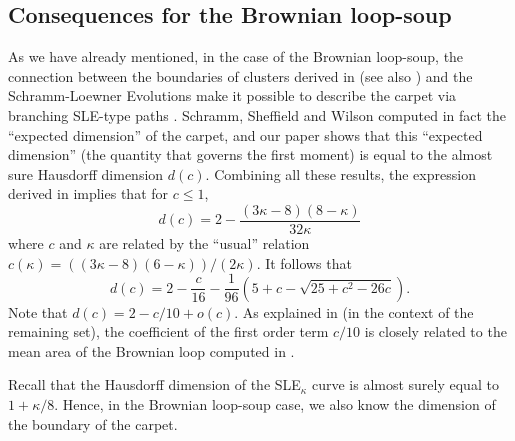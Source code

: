 \documentclass[11pt]{article}
\begin{document}
 
\subsection {Consequences for the Brownian loop-soup}

As we have already mentioned, in the case of the Brownian loop-soup, 
the connection between the boundaries of clusters derived in 
\cite {ShW,ShW2} (see also \cite {Wcras}) and the Schramm-Loewner Evolutions 
make it possible to describe the carpet via branching SLE-type paths \cite {Sh}. 
Schramm, Sheffield and Wilson \cite {SchShW} computed in fact the 
``expected dimension'' of the carpet, and our paper shows that this 
``expected dimension'' (the quantity that governs the first moment) is equal to
the almost sure Hausdorff dimension $d(c)$. 
Combining all these results, the expression derived 
in \cite {SchShW} implies that for $c\le 1$,
$$ 
d(c) = 2 - \frac {(3 \kappa - 8)(8 - \kappa)} {32 \kappa}
$$
where $c$ and $\kappa$ are related by the ``usual'' relation 
$
c(\kappa) = ({(3\kappa -8) (6 - \kappa)})/({2 \kappa})$. 
It follows that
$$
d(c) = 2 - \frac {c}{16} - \frac {1}{96} \left( 5 + c - \sqrt { 25 + c^2 - 26 c } \right). 
$$
Note that $d(c) = 2 - c/10 + o (c)$. 
As explained in \cite {Th} (in the context of the remaining set), the coefficient of the first order term $c/10$ is closely related to the mean area of the Brownian loop computed in \cite {GTF}.

Recall \cite {Be, Ladim} that the Hausdorff dimension of the SLE$_\kappa$ curve is almost surely equal to  $1 + \kappa/8$. Hence, in the Brownian loop-soup case, we also know the dimension of the boundary of the carpet. 
\end{document}
